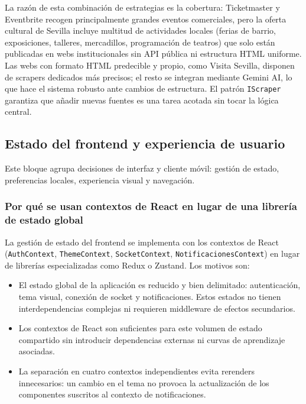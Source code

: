 La razón de esta combinación de estrategias es la cobertura: Ticketmaster y Eventbrite recogen principalmente grandes eventos comerciales, pero la oferta cultural de Sevilla incluye multitud de actividades locales (ferias de barrio, exposiciones, talleres, mercadillos, programación de teatros) que solo están publicadas en webs institucionales sin API pública ni estructura HTML uniforme. Las webs con formato HTML predecible y propio, como Visita Sevilla, disponen de scrapers dedicados más precisos; el resto se integran mediante Gemini AI, lo que hace el sistema robusto ante cambios de estructura. El patrón \texttt{IScraper} garantiza que añadir nuevas fuentes es una tarea acotada sin tocar la lógica central.

\subsection{Estado del frontend y experiencia de usuario}

Este bloque agrupa decisiones de interfaz y cliente móvil: gestión de estado, preferencias locales, experiencia visual y navegación.

\subsubsection{Por qué se usan contextos de React en lugar de una librería de estado global}

La gestión de estado del frontend se implementa con los contextos de React (\texttt{AuthContext}, \texttt{ThemeContext}, \texttt{SocketContext}, \texttt{NotificacionesContext}) en lugar de librerías especializadas como Redux o Zustand. Los motivos son:

\begin{itemize}
    \item El estado global de la aplicación es reducido y bien delimitado: autenticación, tema visual, conexión de socket y notificaciones. Estos estados no tienen interdependencias complejas ni requieren middleware de efectos secundarios.
    \item Los contextos de React son suficientes para este volumen de estado compartido sin introducir dependencias externas ni curvas de aprendizaje asociadas.
    \item La separación en cuatro contextos independientes evita rerenders innecesarios: un cambio en el tema no provoca la actualización de los componentes suscritos al contexto de notificaciones.
\end{itemize}

